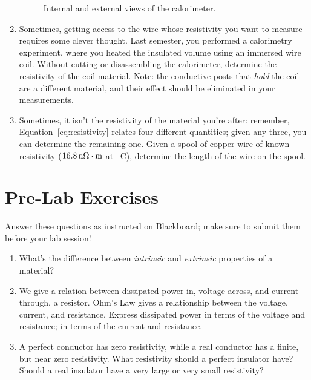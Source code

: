 \documentclass[12pt]{article}
\begin{document}
\begin{enumerate}
\begin{figure}
{%
  }
  \caption{Internal and external views of the calorimeter.}
  \label{fig:calorimeter}
\end{figure}
\item Sometimes, getting access to the wire whose resistivity you want
  to measure requires some clever thought.  Last semester, you
  performed a calorimetry experiment, where you heated the insulated
  volume using an immersed wire coil.  Without cutting or
  disassembling the calorimeter, determine the resistivity of the
  coil material.  Note: the conductive posts that \textit{hold} the
  coil are a different material, and their effect should be eliminated
  in your measurements.
\item Sometimes, it isn't the resistivity of the material you're after:
  remember, Equation~\eqref{eq:resistivity} relates four different
  quantities; given any three, you can determine the remaining one.
  Given a spool of copper wire of known resistivity
  ($\unit[16.8]{n\Omega \cdot m}$ at \unit[20]{\textdegree C}),
  determine the length of the wire on the spool.
\end{enumerate}

\newpage

\section*{Pre-Lab Exercises}

Answer these questions as instructed on Blackboard; make sure to
submit them before your lab session!

\begin{enumerate}
\item What's the difference between \textit{intrinsic} and
  \textit{extrinsic} properties of a material?
\item We give a relation between dissipated power in, voltage across, and
  current through, a resistor.  Ohm's Law gives a relationship between
  the voltage, current, and resistance.  Express dissipated power in
  terms of the voltage and resistance; in terms of the current and
  resistance. 
\item A perfect conductor has zero resistivity, while a real conductor
  has a finite, but near zero resistivity.  What resistivity should a
  perfect insulator have?  Should a real insulator have a very large
  or very small resistivity?
\end{enumerate}

\newpage
\end{document}
